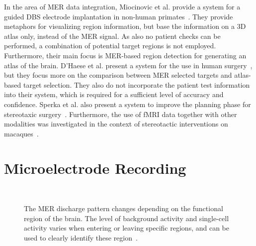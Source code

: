 \documentclass{vgtc}                          %
\begin{document}
In the area of MER data integration, Miocinovic et al. provide a system for a guided DBS electrode implantation in non-human primates~\cite{Miocinovic2007}. They provide metaphors for visualizing region information, but base the information on a 3D atlas only, instead of the MER signal. As also no patient checks can be performed, a combination of potential target regions is not employed. Furthermore, their main focus is MER-based region detection for generating an atlas of the brain. D'Haese et al. present a system for the use in human surgery~\cite{Haese2005}, but they focus more on the comparison between MER selected targets and atlas-based target selection. They also do not incorporate the patient test information into their system, which is required for a sufficient level of accuracy and confidence. Sperka et al. also present a system to improve the planning phase for stereotaxic surgery~\cite{Sperka2011}. Furthermore, the use of fMRI data together with other modalities was investigated in the context of stereotactic interventions on macaques~\cite{Ohayon2012}.



\section{Microelectrode Recording}\label{sec:mer}
\begin{figure}
    \centering
    \\
    \caption{The MER discharge pattern changes depending on the functional region of the brain. The level of background activity and single-cell activity varies when entering or leaving specific regions, and can be used to clearly identify these region~\cite{Benazzouz2002,Hutchison1998}.}
    \label{fig:dischargepatterns}
\end{figure}
\end{document}
